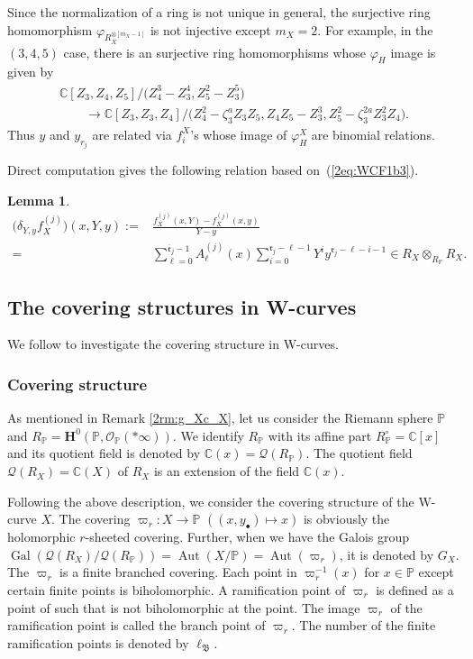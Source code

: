 \documentclass[10pt,a4paper]{amsart}
\def\CC{{\mathbb C}}
\def\PP{{\mathbb P}}
\def\bH{{\mathbf F}}
\def\bH{{\mathbf H}}
\def\cO{{\mathcal O}}
\def\cQ{{\mathcal Q}}
\def\fB{{\mathfrak B}}
\def\fr{{\mathfrak r}}
\def\Bfr{{\overline{\mathfrak r}}}
\def\Aut{\operatorname{Aut}}
\def\Gal{\operatorname{Gal}}
\numberwithin{equation}{section}
\newtheorem{Lemma}[Theorem]{Lemma}
\begin{document}
\begin{Remark}
Since the normalization of a ring is not unique in general, the surjective ring homomorphism $\varphi_{R_X^{\otimes[m_X-1]}}$ is not injective except $m_X=2$.
For example, in the $(3,4,5)$ case, there is an surjective ring homomorphisms whose $\varphi_H$ image is given by
\begin{gather*}
\CC[Z_3,Z_4,Z_5]/\big(Z_4^3-Z_3^4,Z_5^2-Z_3^5\big)\\
\qquad{} \to \CC[Z_3,Z_3,Z_4]/\big(Z_4^2- \zeta_3^a Z_3 Z_5, Z_4 Z_5 - Z_3^3, Z_5^2 - \zeta_3^{2a}Z_3^2 Z_4\big).
\end{gather*}
Thus $y$ and $y_{r_j}$ are related via $f^X_i$'s whose
image of $\varphi_H^X$ are binomial relations.
\end{Remark}

Direct computation gives the following relation based on~(\ref{2eq:WCF1b3}).

\begin{Lemma}\label{2lm:dy_rj/dx}
\begin{align*}
\big(\delta_{Y,y} f_X^{(j)}\big)(x,Y,y)
:={}& \frac{f_X^{(j)}(x,Y) - f_X^{(j)}(x,y)}{Y-y} \\
={}& \sum_{\ell=0}^{\Bfr_j-1}A_{\ell}^{(j)}(x)
\sum_{i=0}^{\fr_j-\ell-1}
Y^i y^{\fr_j-\ell-i-1} \in R_X \otimes_{R_\PP} R_X.
\end{align*}
\end{Lemma}

\subsection{The covering structures in W-curves}\label{2sc:Covering}

We follow \cite{Kunz2004, Stichtenoth} to investigate the covering structure in W-curves.

\subsubsection{Covering structure}
\label{2sc:GaloisCover}

As mentioned in Remark \ref{2rm:g_Xc_X}, let us consider the Riemann sphere $\PP$ and $R_\PP=\bH^0(\PP, \cO_{\PP}(*\infty))$. We identify $R_\PP$ with its affine part $R_\PP^\circ=\CC[x]$ and its quotient field is denoted by $\CC(x)=\cQ(R_\PP)$.
The quotient field $\cQ(R_X)=\CC(X)$ of $R_X$ is an extension of the field $\CC(x)$.

Following the above description, we consider the covering structure of the W-curve $X$.
The covering $\varpi_r\colon X \to \PP$ $((x,y_\bullet) \mapsto x)$ is obviously the holomorphic $r$-sheeted covering.
Further, when we have the Galois group $\Gal(\cQ(R_X)/\cQ(R_\PP))=\Aut(X/\PP)=\Aut(\varpi_r)$, it is denoted by $G_X$.
The $\varpi_{r}$ is a finite branched covering.
Each point in $\varpi_r^{-1}(x)$ for $x \in \PP$ except certain finite points is biholomorphic.
A ramification point of $\varpi_{r}$ is defined as a point of such that is not biholomorphic at the point.
The image $\varpi_{r}$ of the ramification point is called the branch point of $\varpi_{r}$. The number of the finite ramification points is denoted by $\ell_{\fB}$.
\end{document}
